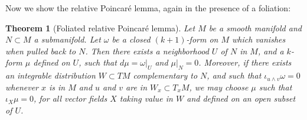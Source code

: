 \documentclass[a4paper,12pt,leqno]{article}
\newtheorem{thm}{Theorem}
\begin{document}
Now we show the relative Poincar\'e lemma, again in the presence of a foliation:


\begin{thm} [Foliated relative Poincar\'e lemma]
Let $M$ be a smooth manifold and $N{\subset} M$ a submanifold. Let $\omega$ be a closed $(k{+}1)$-form on $M$ which vanishes when 
pulled back to $N$. Then there exists a neighborhood $U$ of $N$ in $M$, and a $k$-form $\mu$ defined on $U$, such that 
$d\mu=\omega|_U$ and $\mu|_N =0$. Moreover, if there exists an integrable distribution $W\subset TM$ complementary to $N$, and 
such that $\iota_{u\wedge v}\omega=0$ whenever $x$ is in $M$ and $u$ and $v$ are in $W_x \subset T_xM$, we may choose 
$\mu$ such that $\iota_{X}\mu=0$, for all vector fields $X$ taking value in $W$ and defined on an open subset of $U$.
\end{thm}
\end{document}
